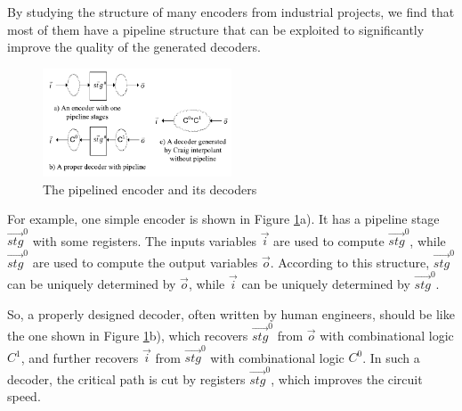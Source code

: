 \documentclass[twocolumn]{article}
\begin{document}
By studying the structure of many encoders from industrial projects,
we find that most of them have a pipeline structure that can be exploited to
significantly improve the quality of the generated decoders.

\begin{figure}[t]
\begin{center}
\includegraphics[width=0.5\textwidth]{pipeline}
\end{center}
  \label{fig_pipe}
\caption{The pipelined encoder and its decoders}
\end{figure}

For example,
one simple encoder is shown in Figure \ref{fig_pipe}a).
It has a pipeline stage $\vec{stg}^0$ with some registers.
The inputs variables $\vec{i}$ are used to compute $\vec{stg}^0$,
while $\vec{stg}^0$ are used to compute the output variables $\vec{o}$.
According to this structure,
$\vec{stg}^0$ can be uniquely determined by $\vec{o}$,
while $\vec{i}$ can be uniquely determined by $\vec{stg}^0$.

So,
a properly designed decoder,
often written by human engineers,
should be like the one shown in Figure \ref{fig_pipe}b),
which recovers $\vec{stg}^0$ from $\vec{o}$ with combinational logic $C^1$,
and further recovers $\vec{i}$ from $\vec{stg}^0$ with combinational logic $C^0$.
In such a decoder,
the critical path is cut by registers $\vec{stg}^0$, 
which improves the circuit speed.

% 
\end{document}
